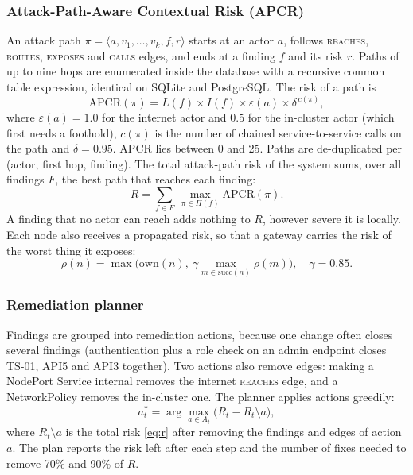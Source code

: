 \documentclass[conference]{IEEEtran}
\newcommand{\apcr}{\mathrm{APCR}}
\begin{document}
\subsubsection{Attack-Path-Aware Contextual Risk (APCR)}
An attack path $\pi=\langle a, v_1,\dots,v_k, f, r\rangle$ starts at an actor $a$, follows \textsc{reaches}, \textsc{routes}, \textsc{exposes} and \textsc{calls} edges, and ends at a finding $f$ and its risk $r$. Paths of up to nine hops are enumerated inside the database with a recursive common table expression, identical on SQLite and PostgreSQL. The risk of a path is
\begin{equation}
\apcr(\pi) = L(f)\times I(f)\times \varepsilon(a)\times \delta^{\,c(\pi)},
\label{eq:apcr}
\end{equation}
where $\varepsilon(a)=1.0$ for the internet actor and $0.5$ for the in-cluster actor (which first needs a foothold), $c(\pi)$ is the number of chained service-to-service calls on the path and $\delta=0.95$. APCR lies between 0 and 25. Paths are de-duplicated per (actor, first hop, finding). The total attack-path risk of the system sums, over all findings $F$, the best path that reaches each finding:
\begin{equation}
R = \sum_{f\in F}\ \max_{\pi\in\Pi(f)} \apcr(\pi).
\label{eq:r}
\end{equation}
A finding that no actor can reach adds nothing to $R$, however severe it is locally. Each node also receives a propagated risk, so that a gateway carries the risk of the worst thing it exposes:
\begin{equation}
\rho(n)=\max\Big(\mathrm{own}(n),\ \gamma\max_{m\in \mathrm{succ}(n)}\rho(m)\Big),\quad \gamma=0.85.
\label{eq:prop}
\end{equation}

\subsubsection{Remediation planner}
Findings are grouped into remediation actions, because one change often closes several findings (authentication plus a role check on an admin endpoint closes TS-01, API5 and API3 together). Two actions also remove edges: making a NodePort Service internal removes the internet \textsc{reaches} edge, and a NetworkPolicy removes the in-cluster one. The planner applies actions greedily:
\begin{equation}
a^{*}_t=\arg\max_{a\in A_t}\big(R_t - R_t\!\setminus\! a\big),
\label{eq:plan}
\end{equation}
where $R_t\!\setminus\! a$ is the total risk \eqref{eq:r} after removing the findings and edges of action $a$. The plan reports the risk left after each step and the number of fixes needed to remove 70\% and 90\% of $R$.
\end{document}
